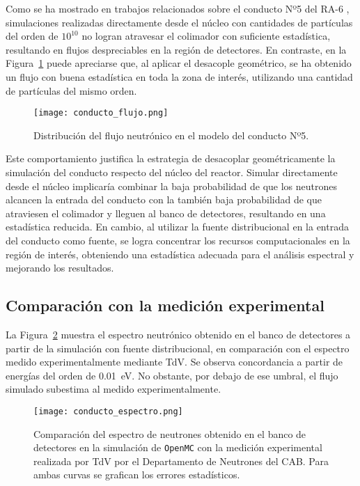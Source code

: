 Como se ha mostrado en trabajos relacionados sobre el conducto Nº5 del RA-6 \cite{Schmidt2021Chopper}, simulaciones realizadas directamente desde el núcleo con cantidades de partículas del orden de $10^{10}$ no logran atravesar el colimador con suficiente estadística, resultando en flujos despreciables en la región de detectores. En contraste, en la Figura~\ref{fig:conducto-flujo} puede apreciarse que, al aplicar el desacople geométrico, se ha obtenido un flujo con buena estadística en toda la zona de interés, utilizando una cantidad de partículas del mismo orden.

\begin{figure}[h]
\centering
\texttt{[image: conducto\_flujo.png]}
\caption{Distribución del flujo neutrónico en el modelo del conducto Nº5.}
\label{fig:conducto-flujo}
\end{figure}

Este comportamiento justifica la estrategia de desacoplar geométricamente la simulación del conducto respecto del núcleo del reactor. Simular directamente desde el núcleo implicaría combinar la baja probabilidad de que los neutrones alcancen la entrada del conducto con la también baja probabilidad de que atraviesen el colimador y lleguen al banco de detectores, resultando en una estadística reducida. En cambio, al utilizar la fuente distribucional en la entrada del conducto como fuente, se logra concentrar los recursos computacionales en la región de interés, obteniendo una estadística adecuada para el análisis espectral y mejorando los resultados.

\subsection{Comparación con la medición experimental}

La Figura~\ref{fig:conducto-espectro} muestra el espectro neutrónico obtenido en el banco de detectores a partir de la simulación con fuente distribucional, en comparación con el espectro medido experimentalmente mediante TdV. Se observa concordancia a partir de energías del orden de 0.01~eV. No obstante, por debajo de ese umbral, el flujo simulado subestima al medido experimentalmente.

\begin{figure}[h]
\centering
\texttt{[image: conducto\_espectro.png]}
\caption{Comparación del espectro de neutrones obtenido en el banco de detectores en la simulación de \texttt{OpenMC} con la medición experimental realizada por TdV por el Departamento de Neutrones del CAB. Para ambas curvas se grafican los errores estadísticos.}
\label{fig:conducto-espectro}
\end{figure}

